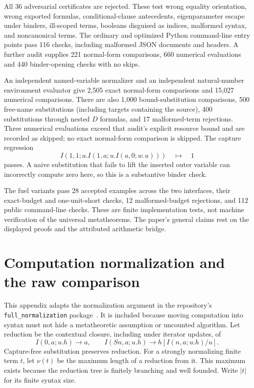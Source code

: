 \documentclass[11pt,letterpaper]{article}
\theoremstyle{definition}\newtheorem{definition}[theorem]{Definition}
\theoremstyle{remark}\newtheorem{remark}[theorem]{Remark}
\begin{document}
All 36 adversarial certificates are rejected. These test wrong equality
orientation, wrong exported formulas, conditional-clause antecedents,
eigenparameter escape under binders, ill-scoped terms, booleans disguised as
indices, malformed syntax, and noncanonical terms. The ordinary and optimized
Python command-line entry points pass 116 checks, including malformed JSON
documents and headers. A further audit supplies 221 normal-form comparisons,
660 numerical evaluations and 440 binder-opening checks with no skips.

An independent named-variable normalizer and an independent natural-number
environment evaluator give 2,505 exact normal-form comparisons and 15,027
numerical comparisons. There are also 1,000 bound-substitution comparisons,
500 free-name substitutions (including targets containing the source),
400 substitutions through nested $D$ formulas, and 17 malformed-term
rejections. Three numerical evaluations exceed that audit's explicit resource
bound and are recorded as skipped; no exact normal-form comparison is skipped.
The capture regression
\[
 I(1,1;a.I(1,a;u.I(a,0;w.u)))\quad\longmapsto\quad 1
\]
passes. A naive substitution that fails to lift the inserted outer variable
can incorrectly compute zero here, so this is a substantive binder check.

The fuel variants pass 28 accepted examples across the two interfaces,
their exact-budget and one-unit-short checks, 12 malformed-budget rejections,
and 112 public command-line checks. These are finite implementation tests,
not machine verification of the universal metatheorems. The paper's general
claims rest on the displayed proofs and the attributed arithmetic bridge.

\appendix
\section{Computation normalization and the raw comparison}
\label{sec:normalization}

This appendix adapts the normalization argument in the repository's
\texttt{full\_normalization} package~\cite{normalization}. It is included
because moving computation into syntax must not hide a metatheoretic
assumption or uncounted algorithm. Let reduction be the contextual closure,
including under iterator updates, of
\[
 I(0,a;u.h)\to a,\qquad I(Sn,a;u.h)\to h[I(n,a;u.h)/u].
\]
Capture-free substitution preserves reduction. For a strongly normalizing
finite term $t$, let $\nu(t)$ be the maximum length of a reduction from it.
This maximum exists because the reduction tree is finitely branching and
well founded. Write $|t|$ for its finite syntax size.
\end{document}
